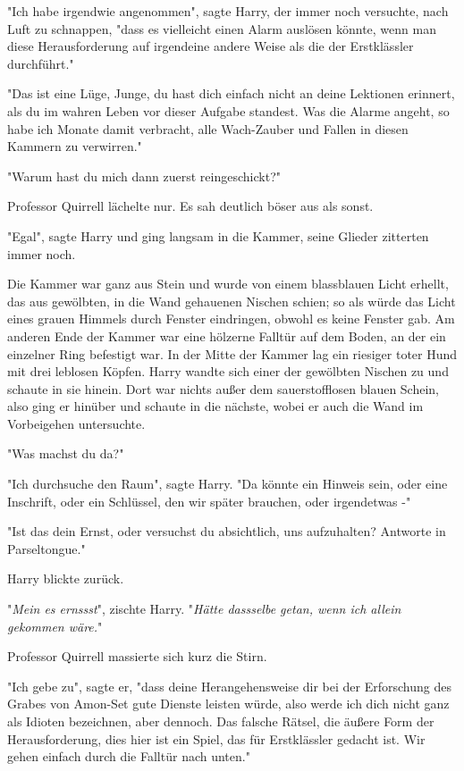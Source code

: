 {"Ich habe irgendwie angenommen", sagte Harry, der immer noch versuchte, nach Luft zu schnappen, "dass es vielleicht einen Alarm auslösen könnte, wenn man diese Herausforderung auf irgendeine andere Weise als die der Erstklässler durchführt."

"Das ist eine Lüge, Junge, du hast dich einfach nicht an deine Lektionen erinnert, als du im wahren Leben vor dieser Aufgabe standest. Was die Alarme angeht, so habe ich Monate damit verbracht, alle Wach-Zauber und Fallen in diesen Kammern zu verwirren."

"Warum hast du mich dann zuerst reingeschickt?"

Professor Quirrell lächelte nur. Es sah deutlich böser aus als sonst.

"Egal", sagte Harry und ging langsam in die Kammer, seine Glieder zitterten immer noch.

Die Kammer war ganz aus Stein und wurde von einem blassblauen Licht erhellt, das aus gewölbten, in die Wand gehauenen Nischen schien; so als würde das Licht eines grauen Himmels durch Fenster eindringen, obwohl es keine Fenster gab. Am anderen Ende der Kammer war eine hölzerne Falltür auf dem Boden, an der ein einzelner Ring befestigt war. In der Mitte der Kammer lag ein riesiger toter Hund mit drei leblosen Köpfen. Harry wandte sich einer der gewölbten Nischen zu und schaute in sie hinein. Dort war nichts außer dem sauerstofflosen blauen Schein, also ging er hinüber und schaute in die nächste, wobei er auch die Wand im Vorbeigehen untersuchte.

"Was machst du da?"

"Ich durchsuche den Raum", sagte Harry. "Da könnte ein Hinweis sein, oder eine Inschrift, oder ein Schlüssel, den wir später brauchen, oder irgendetwas -"

"Ist das dein Ernst, oder versuchst du absichtlich, uns aufzuhalten? Antworte in Parseltongue."

Harry blickte zurück.

"\emph{Mein es ernssst}", zischte Harry. "\emph{Hätte dassselbe getan, wenn ich allein gekommen wäre.}"

Professor Quirrell massierte sich kurz die Stirn.

"Ich gebe zu", sagte er, "dass deine Herangehensweise dir bei der Erforschung des Grabes von Amon-Set gute Dienste leisten würde, also werde ich dich nicht ganz als Idioten bezeichnen, aber dennoch. Das falsche Rätsel, die äußere Form der Herausforderung, dies hier ist ein Spiel, das für Erstklässler gedacht ist. Wir gehen einfach durch die Falltür nach unten."

}
